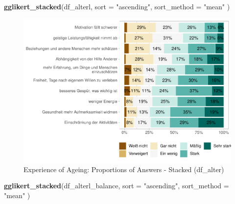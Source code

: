 \documentclass[
  doc]{apa6}
\newenvironment{Shaded}{\begin{snugshade}}{\end{snugshade}}
\newcommand{\AttributeTok}[1]{\textcolor[rgb]{0.13,0.29,0.53}{#1}}
\newcommand{\FunctionTok}[1]{\textcolor[rgb]{0.13,0.29,0.53}{\textbf{#1}}}
\newcommand{\NormalTok}[1]{#1}
\newcommand{\StringTok}[1]{\textcolor[rgb]{0.31,0.60,0.02}{#1}}
\begin{document}
\begin{Shaded}
\begin{Highlighting}[]
\FunctionTok{gglikert\_stacked}\NormalTok{(df\_alterl,}
                 \AttributeTok{sort =} \StringTok{"ascending"}\NormalTok{,}
                 \AttributeTok{sort\_method =} \StringTok{"mean"}
\NormalTok{                 )}
\end{Highlighting}
\end{Shaded}

\begin{figure}
\centering
\includegraphics{desc_NRW80_files/figure-latex/likertalterl3-1.pdf}
\caption{\label{fig:likertalterl3}Experience of Ageing: Proportions of Answers - Stacked (df\_alter)}
\end{figure}

\begin{Shaded}
\begin{Highlighting}[]
\FunctionTok{gglikert\_stacked}\NormalTok{(df\_alterl\_balance,}
                 \AttributeTok{sort =} \StringTok{"ascending"}\NormalTok{,}
                 \AttributeTok{sort\_method =} \StringTok{"mean"}
\NormalTok{                 )}
\end{Highlighting}
\end{Shaded}
\end{document}
